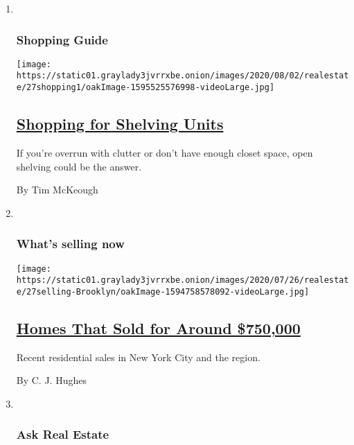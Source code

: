 \begin{enumerate}
\def\labelenumi{\arabic{enumi}.}
\item ~
  \hypertarget{shopping-guide}{%
  \subsubsection{Shopping Guide}\label{shopping-guide}}

  \texttt{[image: https://static01.graylady3jvrrxbe.onion/images/2020/08/02/realestate/27shopping1/oakImage-1595525576998-videoLarge.jpg]}

  \hypertarget{shopping-for-shelving-units}{%
  \subsection{\texorpdfstring{\href{/2020/07/27/realestate/shopping-for-shelving-units.html}{Shopping
  for Shelving
  Units}}{Shopping for Shelving Units}}\label{shopping-for-shelving-units}}

  If you're overrun with clutter or don't have enough closet space, open
  shelving could be the answer.

  By Tim McKeough
\item ~
  \hypertarget{whats-selling-now}{%
  \subsubsection{What's selling now}\label{whats-selling-now}}

  \texttt{[image: https://static01.graylady3jvrrxbe.onion/images/2020/07/26/realestate/27selling-Brooklyn/oakImage-1594758578092-videoLarge.jpg]}

  \hypertarget{homes-that-sold-for-around-750000}{%
  \subsection{\texorpdfstring{\href{/2020/07/26/realestate/homes-that-sold-for-around-750000.html}{Homes
  That Sold for Around
  \$750,000}}{Homes That Sold for Around \$750,000}}\label{homes-that-sold-for-around-750000}}

  Recent residential sales in New York City and the region.

  By C. J. Hughes
\item ~
  \hypertarget{ask-real-estate}{%
  \subsubsection{Ask Real Estate}\label{ask-real-estate}}


\end{enumerate}

